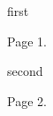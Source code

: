 \documentclass[notebook]{elementals}
\begin{document}
\startnotebook{\nTricorder{}}

\begin{page}{first}

Page 1.
\end{page}

\begin{page}{second}

Page 2.
\end{page}

\endnotebook
\end{document}
